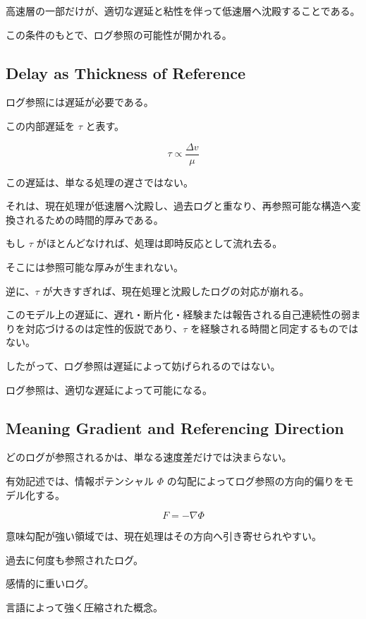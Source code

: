高速層の一部だけが、適切な遅延と粘性を伴って低速層へ沈殿することである。

この条件のもとで、ログ参照の可能性が開かれる。

\subsection{Delay as Thickness of Reference}

ログ参照には遅延が必要である。

この内部遅延を $\tau$ と表す。

\begin{equation}
\tau \propto \frac{\Delta v}{\mu}
\end{equation}

この遅延は、単なる処理の遅さではない。

それは、現在処理が低速層へ沈殿し、過去ログと重なり、再参照可能な構造へ変換されるための時間的厚みである。

もし $\tau$ がほとんどなければ、処理は即時反応として流れ去る。

そこには参照可能な厚みが生まれない。

逆に、$\tau$ が大きすぎれば、現在処理と沈殿したログの対応が崩れる。

このモデル上の遅延に、遅れ・断片化・経験または報告される自己連続性の弱まりを対応づけるのは定性的仮説であり、$\tau$ を経験される時間と同定するものではない。

したがって、ログ参照は遅延によって妨げられるのではない。

ログ参照は、適切な遅延によって可能になる。

\subsection{Meaning Gradient and Referencing Direction}

どのログが参照されるかは、単なる速度差だけでは決まらない。

有効記述では、情報ポテンシャル $\Phi$ の勾配によってログ参照の方向的偏りをモデル化する。

\begin{equation}
F = -\nabla \Phi
\end{equation}

意味勾配が強い領域では、現在処理はその方向へ引き寄せられやすい。

過去に何度も参照されたログ。

感情的に重いログ。

言語によって強く圧縮された概念。

